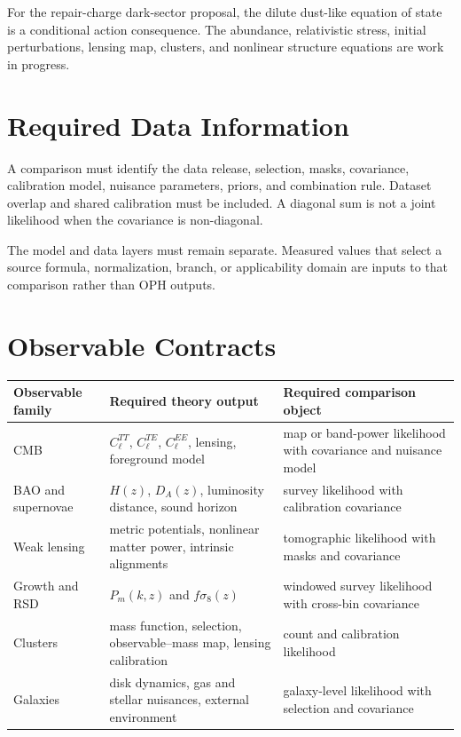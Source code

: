 \documentclass[11pt]{article}
\begin{document}
For the repair-charge dark-sector proposal, the dilute dust-like equation of
state is a conditional action consequence. The abundance, relativistic stress,
initial perturbations, lensing map, clusters, and nonlinear structure equations
are work in progress.

\section{Required Data Information}

A comparison must identify the data release, selection, masks, covariance,
calibration model, nuisance parameters, priors, and combination rule. Dataset
overlap and shared calibration must be included. A diagonal sum is not a joint
likelihood when the covariance is non-diagonal.

The model and data layers must remain separate. Measured values that select
a source formula, normalization, branch, or applicability domain are inputs to
that comparison rather than OPH outputs.

\section{Observable Contracts}

\begin{center}
\begin{tabularx}{\textwidth}{@{}lXX@{}}
\toprule
Observable family & Required theory output & Required comparison object \\
\midrule
CMB & $C_\ell^{TT}$, $C_\ell^{TE}$, $C_\ell^{EE}$, lensing, foreground model &
map or band-power likelihood with covariance and nuisance model \\
BAO and supernovae & $H(z)$, $D_A(z)$, luminosity distance, sound horizon &
survey likelihood with calibration covariance \\
Weak lensing & metric potentials, nonlinear matter power, intrinsic alignments &
tomographic likelihood with masks and covariance \\
Growth and RSD & $P_m(k,z)$ and $f\sigma_8(z)$ &
windowed survey likelihood with cross-bin covariance \\
Clusters & mass function, selection, observable--mass map, lensing calibration &
count and calibration likelihood \\
Galaxies & disk dynamics, gas and stellar nuisances, external environment &
galaxy-level likelihood with selection and covariance \\
\bottomrule
\end{tabularx}
\end{center}
\end{document}
